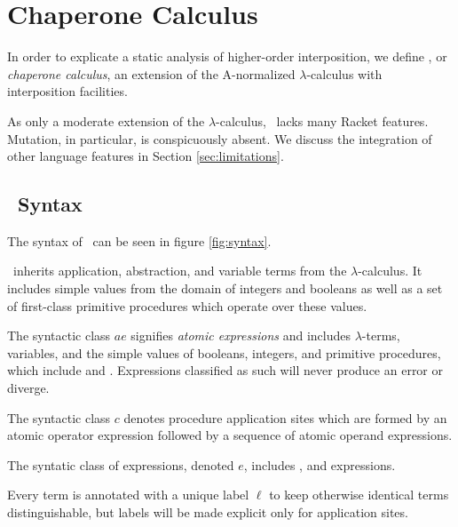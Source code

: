 \section{Chaperone Calculus}

In order to explicate a static analysis of higher-order interposition, we define \chapcalc, or \emph{chaperone calculus}, an extension of the A-normalized $\lambda$-calculus with interposition facilities.

As only a moderate extension of the $\lambda$-calculus, \chapcalc\ lacks many Racket features.
Mutation, in particular, is conspicuously absent.
We discuss the integration of other language features in Section \ref{sec:limitations}.


\subsection{\chapcalc\ Syntax}

The syntax of \chapcalc\ can be seen in figure \ref{fig:syntax}.

\chapcalc\ inherits application, abstraction, and variable terms from the $\lambda$-calculus.
It includes simple values from the domain of integers and booleans as well as a set of first-class primitive procedures which operate over these values.

The syntactic class $\mathit{ae}$ signifies \emph{atomic expressions} and includes $\lambda$-terms, variables, and the simple values of booleans, integers, and primitive procedures, which include  and .
Expressions classified as such will never produce an error or diverge.

The syntactic class $c$ denotes procedure application sites which are formed by an atomic operator expression followed by a sequence of atomic operand expressions.

The syntatic class of expressions, denoted $e$, includes , and  expressions.

Every term is annotated with a unique label $\ell$ to keep otherwise identical terms distinguishable, but labels will be made explicit only for application sites.

\newcommand{\vx}[0]{\mathbf{x}}

\newcommand{\appe}[2]{(#1\,#2)^\ell}
\newcommand{\lame}[2]{(\lambda\,(#1)\,#2)}
\newcommand{\chae}[2]{(\mathit{chaperone\mhyphen operator}\,#1\,#2)^\ell}
\newcommand{\impe}[2]{(\mathit{impersonate\mhyphen operator}\,#1\,#2)}
\newcommand{\lete}[3]{(\mathbf{let}\,((#1)\,#2)\,#3)}
\newcommand{\ife}[3]{(\mathbf{if}\,#1\,#2\,#3)}

